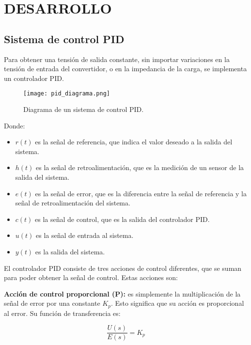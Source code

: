 \section{\large{DESARROLLO}}
\vspace{-0.5cm}
\justifying

\subsection{\textbf{Sistema de control PID}}
\vspace{-0.5cm}
Para obtener una tensión de salida constante, sin importar variaciones en la tensión de entrada del
convertidor, o en la impedancia de la carga, se implementa un controlador PID.

\begin{figure}[H]
    \centering
    \texttt{[image: pid\_diagrama.png]}
    \vspace{-0.25cm}
    \caption{Diagrama de un sistema de control PID. \parencite{PICUINO}}
    \label{fig:pid_diagrama}
\end{figure}
\vspace{-0.5cm}

Donde:
\begin{itemize}[noitemsep]
    \item $r(t)$ es la señal de referencia, que indica el valor deseado a la salida del sistema.
    \item $h(t)$ es la señal de retroalimentación, que es la medición de un sensor de la salida del sistema.
    \item $e(t)$ es la señal de error, que es la diferencia entre la señal de referencia y la señal de
          retroalimentación del sistema.
    \item $c(t)$ es la señal de control, que es la salida del controlador PID.
    \item $u(t)$ es la señal de entrada al sistema.
    \item $y(t)$ es la salida del sistema.
\end{itemize}

El controlador PID consiste de tres acciones de control diferentes, que se suman para poder
obtener la señal de control. Estas acciones son:

\textbf{Acción de control proporcional (P):} es simplemente la multiplicación de la señal de error por
una constante $K_p$. Esto significa que su acción es proporcional al error. Su función de transferencia es:

\vspace{-0.5cm}
\begin{equation}
    \dfrac{U(s)}{E(s)} = K_p
\end{equation}
\vspace{-0.5cm}

